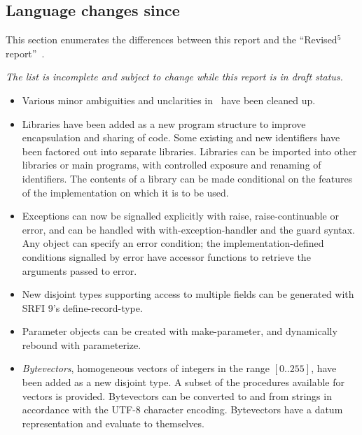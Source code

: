 

\subsection*{Language changes since \rfivers}
\label{differences}
This section enumerates the differences between this report and
the ``Revised$^5$ report''~\cite{R5RS}.

{\em The list is incomplete and subject to change while this report is in draft status.}


\begin{itemize}

\item Various minor ambiguities and unclarities in \rfivers\ have been cleaned up.

\item Libraries have been added as a new program structure to improve
encapsulation and sharing of code.  Some existing and new identifiers
have been factored out into separate libraries.
Libraries can be imported into other libraries or main programs, with
controlled exposure and renaming of identifiers.
The contents of a library can be made conditional on the features of
the implementation on which it is to be used.

\item Exceptions can now be signalled explicitly with {\cf raise},
{\cf raise-continuable} or {\cf error}, and can be handled with {\cf
with-exception-handler} and the {\cf guard} syntax.
Any object can specify an error condition; the implementation-defined
conditions signalled by {\cf error} have accessor functions to
retrieve the arguments passed to {\cf error}.

\item New disjoint types supporting access to multiple fields can be
generated with SRFI 9's {\cf define-record-type}.

\item Parameter objects can be created with {\cf make-parameter}, and
dynamically rebound with {\cf parameterize}.

\item {\em Bytevectors}, homogeneous vectors of integers in the range
$[0..255]$, have been added as a new disjoint type.
A subset of the procedures available for vectors is provided.  Bytevectors
can be converted to and from strings in accordance with the UTF-8 character encoding.
Bytevectors have a datum representation and evaluate to themselves.


\end{itemize}
